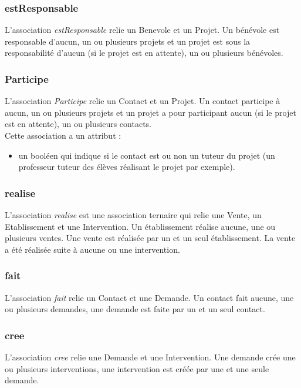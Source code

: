 \subsubsection*{estResponsable}
L'association \textit{estResponsable} relie un Benevole et un Projet. Un bénévole est responsable d'aucun, un ou plusieurs projets et un projet est sous la responsabilité d'aucun (si le projet est en attente), un ou plusieurs bénévoles.

\subsubsection*{Participe}
L'association \textit{Participe} relie un Contact et un Projet. Un contact participe à aucun, un ou plusieurs projets et un projet a pour participant aucun (si le projet est en attente), un ou plusieurs contacts.\\
Cette association a un attribut :
\begin{itemize}
\item un booléen qui indique si le contact est ou non un tuteur du projet (un professeur tuteur des élèves réalisant le projet par exemple). 
\end{itemize}

\subsubsection*{realise}

L'association \textit{realise} est une association ternaire qui relie une Vente, un Etablissement et une Intervention. Un établissement réalise aucune, une ou plusieurs ventes. Une vente est réalisée par un et un seul établissement. La vente a été réalisée suite à aucune ou une intervention.

\subsubsection*{fait}

L'association \textit{fait} relie un Contact et une Demande. Un contact fait aucune, une ou plusieurs demandes, une demande est faite par un et un seul contact.

\subsubsection*{cree}

L'association \textit{cree} relie une Demande et une Intervention. Une demande crée une ou plusieurs interventions, une intervention est créée par une et une seule demande.


